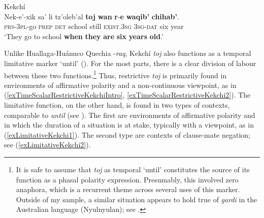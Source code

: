 \begin{exe}
\ex Kekchí\label{exTimeScalarRestrictiveKekchi2}\\
	\gll Nek-e'-xik sa' li tz'oleb'al \textbf{toj} \textbf{wan} \textbf{r}-\textbf{e} \textbf{waqib'} \textbf{chihab'}.\\
	\textsc{prs}-3\textsc{pl}-go \textsc{prep} \textsc{det} school still \textsc{exist}.3\textsc{sg} 3\textsc{sg}-\textsc{dat} six year\\
	\glt \lq They go to school \textbf{when} \textbf{they} \textbf{are} \textbf{six} \textbf{years} \textbf{old}.' \parencite[466]{Kockelman2020}
\end{exe}

Unlike Huallaga-Huánuco Quechia \mbox{-\textit{raq}}, Kekchí \textit{toj} also functions as a temporal limitative marker \lq until\rq{ }(). For the most parts, there is a clear division of labour between these two functions.\footnote{It is safe to assume that \textit{toj} as temporal \lq until\rq{ }constitutes the source of its function as a phasal polarity expression. Presumably, this involved zero anaphora, which is a recurrent theme across several uses of this marker. Outside of my sample, a similar situation appears to hold true of \textit{gardi} in the Australian language  (Nyulnyulan); see \textcite[649–651]{Bowern2012}.} Thus, restrictive \textit{toj} is primarily found in environments of affirmative polarity and a non-continuous viewpoint, as in (\ref{exTimeScalarRestrictiveKekchiIntro}, \ref{exTimeScalarRestrictiveKekchi2}). The limitative function, on the other hand, is found in two types of contexts, comparable to  \textit{until} (see \cite{Lakoff1969}). The first are environments of affirmative polarity and in which the duration of a situation is at stake, typically with a  viewpoint, as in (\ref{exLimitativeKekchi1}). The second type are contexts of clause-mate negation; see (\ref{exLimitativeKekchi2}).

